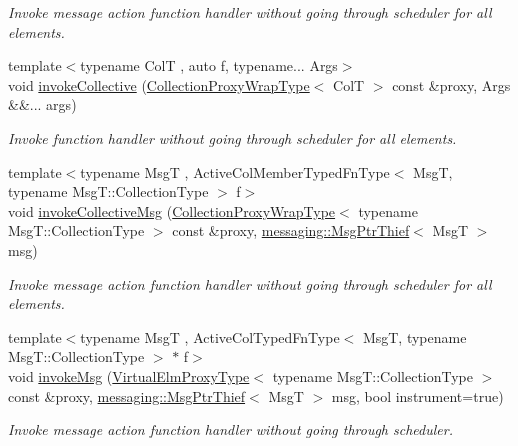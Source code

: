 \begin{DoxyCompactItemize}
\begin{DoxyCompactList}\small\item\em Invoke message action function handler without going through scheduler for all elements. \end{DoxyCompactList}\item 
{\footnotesize template$<$typename ColT , auto f, typename... Args$>$ }\\void \hyperlink{structvt_1_1vrt_1_1collection_1_1_collection_manager_ab1a88b9d0e53a42df1c897f8d73f8475}{invoke\+Collective} (\hyperlink{structvt_1_1vrt_1_1collection_1_1_collection_manager_a56458ed7f9bb22b631b9b3a745f42f94}{Collection\+Proxy\+Wrap\+Type}$<$ ColT $>$ const \&proxy, Args \&\&... args)
\begin{DoxyCompactList}\small\item\em Invoke function handler without going through scheduler for all elements. \end{DoxyCompactList}\item 
{\footnotesize template$<$typename MsgT , Active\+Col\+Member\+Typed\+Fn\+Type$<$ Msg\+T, typename Msg\+T\+::\+Collection\+Type $>$ f$>$ }\\void \hyperlink{structvt_1_1vrt_1_1collection_1_1_collection_manager_aecbe91648c89bff4635fbd782ccd458a}{invoke\+Collective\+Msg} (\hyperlink{structvt_1_1vrt_1_1collection_1_1_collection_manager_a56458ed7f9bb22b631b9b3a745f42f94}{Collection\+Proxy\+Wrap\+Type}$<$ typename Msg\+T\+::\+Collection\+Type $>$ const \&proxy, \hyperlink{structvt_1_1messaging_1_1_msg_ptr_thief}{messaging\+::\+Msg\+Ptr\+Thief}$<$ MsgT $>$ msg)
\begin{DoxyCompactList}\small\item\em Invoke message action function handler without going through scheduler for all elements. \end{DoxyCompactList}\item 
{\footnotesize template$<$typename MsgT , Active\+Col\+Typed\+Fn\+Type$<$ Msg\+T, typename Msg\+T\+::\+Collection\+Type $>$ $\ast$ f$>$ }\\void \hyperlink{structvt_1_1vrt_1_1collection_1_1_collection_manager_accc84ffa2eb3851892143aad927dd799}{invoke\+Msg} (\hyperlink{namespacevt_1_1vrt_a620a5c8c59d13e513f690c74b4af516f}{Virtual\+Elm\+Proxy\+Type}$<$ typename Msg\+T\+::\+Collection\+Type $>$ const \&proxy, \hyperlink{structvt_1_1messaging_1_1_msg_ptr_thief}{messaging\+::\+Msg\+Ptr\+Thief}$<$ MsgT $>$ msg, bool instrument=true)
\begin{DoxyCompactList}\small\item\em Invoke message action function handler without going through scheduler. \end{DoxyCompactList}\item 

\end{DoxyCompactItemize}
